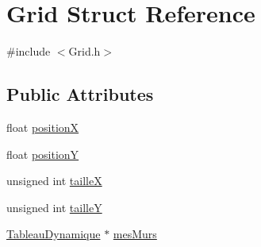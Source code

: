 \hypertarget{structGrid}{\section{Grid Struct Reference}
\label{structGrid}
}


{\ttfamily \#include $<$Grid.\-h$>$}

\subsection*{Public Attributes}
\begin{DoxyCompactItemize}
\item 
float \hyperlink{structGrid_a1712b348175d1449f924218abc2c180b}{position\-X}
\item 
float \hyperlink{structGrid_aa084d4ec2894df907e02718c88ab4060}{position\-Y}
\item 
unsigned int \hyperlink{structGrid_ad6ec58066a6303fbc2aa5443840cf067}{taille\-X}
\item 
unsigned int \hyperlink{structGrid_adc12ffc8da211af2444db8a2007e5a7d}{taille\-Y}
\item 
\hyperlink{structTableauDynamique}{Tableau\-Dynamique} $\ast$ \hyperlink{structGrid_a3ddcfd994b5a6f3f6d73aefc923b65f8}{mes\-Murs}
\end{DoxyCompactItemize}


